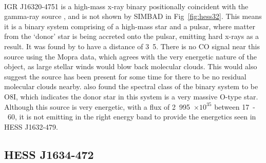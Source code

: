 \documentclass[a4paper, titlepage, oneside]{article}
\newcommand{\e}[1]{\ensuremath{\times 10^{#1}}}
\newcommand{\parsec}{\mathrm{pc}}
\newcommand{\erg}{\mathrm{erg}}
\begin{document}
\begin{multicols}{2}
\paragraph{}
IGR J16320-4751 is a high-mass x-ray binary positionally coincident with the gamma-ray source \parencite{Aharonian:2006}, and is not shown by SIMBAD in Fig~\ref{fig:hess32}. This means it is a binary system comprising of a high-mass star and a pulsar, where matter from the `donor' star is being accreted onto the pulsar, emitting hard x-rays as a result. It was found by \textcite{Lutovinov:2013} to have a distance of \unit{3.5}{\kilo\parsec}. There is no CO signal near this source using the Mopra data, which agrees with the very energetic nature of the object, as large stellar winds would blow back molecular clouds. This would also suggest the source has been present for some time for there to be no residual molecular clouds nearby. \textcite{Lutovinov:2013} also found the spectral class of the binary system to be O8I, which indicates the donor star in this system is a very massive O-type star. Although this source is very energetic, with a flux of \unit{2.995\e{35}}{\erg\usk\reciprocal\second} between \unit{17-60}{\kilo\electronvolt}, it is not emitting in the right energy band to provide the energetics seen in HESS J1632-479.

\subsection{HESS J1634-472}
\label{sec:hess34}


\end{multicols}
\end{document}
